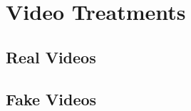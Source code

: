 \documentclass[12pt,letterpaper]{article}
\begin{document}
\section{Video Treatments}\label{sec:videos}

\subsection{Real Videos}

\subsection{Fake Videos}

\end{document}
